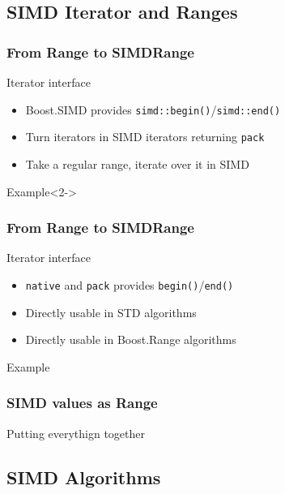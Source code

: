 \subsection{SIMD Iterator and Ranges}
\frame
{
  \frametitle{From Range to SIMDRange}
  \begin{block}{Iterator interface}
  \begin{itemize}
  \item Boost.SIMD provides \texttt{simd::begin()}/\texttt{simd::end()}
  \item Turn iterators in SIMD iterators returning \texttt{pack}
  \item Take a regular range, iterate over it in SIMD
  \end{itemize}
  \end{block}

  \begin{block}{Example}<2->
  \begin{center}
  \end{center}
  \end{block}
}

\frame
{
  \frametitle{From Range to SIMDRange}
  \begin{block}{Iterator interface}
  \begin{itemize}
  \item \texttt{native} and \texttt{pack} provides \texttt{begin()}/\texttt{end()}
  \item Directly usable in STD algorithms
  \item Directly usable in Boost.Range algorithms
  \end{itemize}
  \end{block}{}

  \begin{block}{Example}
  \begin{center}
  \lstpackrange
  \end{center}
  \end{block}{}
}

\frame
{
  \frametitle{SIMD values as Range}
  \begin{block}{Putting everythign together}
  \begin{center}
  \lstranges
  \end{center}
  \end{block}{}
}

\subsection{SIMD Algorithms}

\frame
{

}

\frame
{

}
